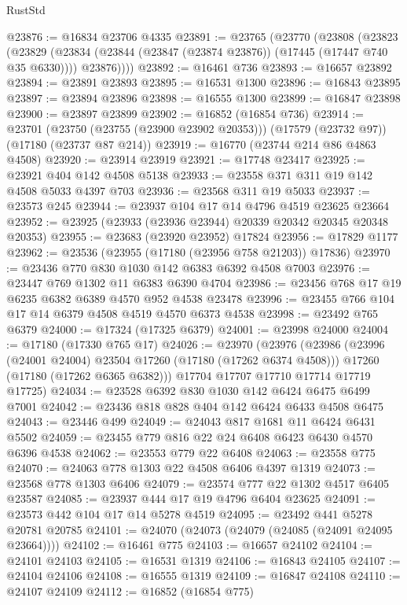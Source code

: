 \begin{lexlean}{RustStd}
\begin{coremodule}
{\begin{coremodule}
{{{{{{{{{{{{{{{{{{{{{{{{{{{{{{{{{{{{{{{{{{{{{{{{{{{{{{{@23876 := @16834 @23706 @4335
@23891 := @23765
    (@23770
      (@23808
        (@23823
          (@23829
            (@23834 (@23844 (@23847 (@23874 @23876)) (@17445 (@17447 @740 @35 @6330))))
            @23876))))
@23892 := @16461 @736
@23893 := @16657 @23892
@23894 := @23891 @23893
@23895 := @16531 @1300
@23896 := @16843 @23895
@23897 := @23894 @23896
@23898 := @16555 @1300
@23899 := @16847 @23898
@23900 := @23897 @23899
@23902 := @16852 (@16854 @736)
@23914 := @23701
    (@23750 (@23755 (@23900 @23902 @20353)))
    (@17579 (@23732 @97))
    (@17180 (@23737 @87 @214))
@23919 := @16770 (@23744 @214 @86 @4863 @4508)
@23920 := @23914 @23919
@23921 := @17748 @23417
@23925 := @23921 @404 @142 @4508 @5138
@23933 := @23558 @371 @311 @19 @142 @4508 @5033 @4397 @703
@23936 := @23568 @311 @19 @5033
@23937 := @23573 @245
@23944 := @23937 @104 @17 @14 @4796 @4519 @23625 @23664
@23952 := @23925 (@23933 (@23936 @23944) @20339 @20342 @20345 @20348 @20353)
@23955 := @23683 (@23920 @23952) @17824
@23956 := @17829 @1177
@23962 := @23536 (@23955 (@17180 (@23956 @758 @21203)) @17836)
@23970 := @23436 @770 @830 @1030 @142 @6383 @6392 @4508 @7003
@23976 := @23447 @769 @1302 @11 @6383 @6390 @4704
@23986 := @23456 @768 @17 @19 @6235 @6382 @6389 @4570 @952 @4538 @23478
@23996 := @23455 @766 @104 @17 @14 @6379 @4508 @4519 @4570 @6373 @4538
@23998 := @23492 @765 @6379
@24000 := @17324 (@17325 @6379)
@24001 := @23998 @24000
@24004 := @17180 (@17330 @765 @17)
@24026 := @23970
    (@23976
      (@23986
        (@23996 (@24001 @24004) @23504 @17260 (@17180 (@17262 @6374 @4508)))
        @17260
        (@17180 (@17262 @6365 @6382)))
      @17704
      @17707
      @17710
      @17714
      @17719
      @17725)
@24034 := @23528 @6392 @830 @1030 @142 @6424 @6475 @6499 @7001
@24042 := @23436 @818 @828 @404 @142 @6424 @6433 @4508 @6475
@24043 := @23446 @499
@24049 := @24043 @817 @1681 @11 @6424 @6431 @5502
@24059 := @23455 @779 @816 @22 @24 @6408 @6423 @6430 @4570 @6396 @4538
@24062 := @23553 @779 @22 @6408
@24063 := @23558 @775
@24070 := @24063 @778 @1303 @22 @4508 @6406 @4397 @1319
@24073 := @23568 @778 @1303 @6406
@24079 := @23574 @777 @22 @1302 @4517 @6405 @23587
@24085 := @23937 @444 @17 @19 @4796 @6404 @23625
@24091 := @23573 @442 @104 @17 @14 @5278 @4519
@24095 := @23492 @441 @5278 @20781 @20785
@24101 := @24070 (@24073 (@24079 (@24085 (@24091 @24095 @23664))))
@24102 := @16461 @775
@24103 := @16657 @24102
@24104 := @24101 @24103
@24105 := @16531 @1319
@24106 := @16843 @24105
@24107 := @24104 @24106
@24108 := @16555 @1319
@24109 := @16847 @24108
@24110 := @24107 @24109
@24112 := @16852 (@16854 @775)
}}}}}}}}}}}}}}}}}}}}}}}}}}}}}}}}}}}}}}}}}}}}}}}}}}}}}}}
\end{coremodule}}
\end{coremodule}
\end{lexlean}

